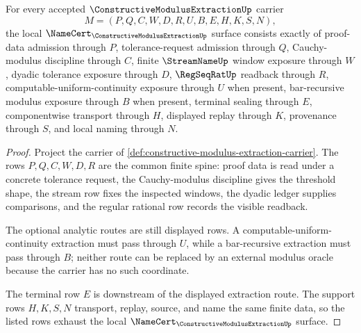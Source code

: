 \begin{theorem}
\label{thm:constructive-modulus-extraction-namecert-obligations}
For every accepted $\ConstructiveModulusExtractionUp$ carrier
$$
M=(P,Q,C,W,D,R,U,B,E,H,K,S,N),
$$
the local $\NameCert_{\ConstructiveModulusExtractionUp}$ surface consists exactly of proof-data admission through $P$, tolerance-request admission through $Q$, Cauchy-modulus discipline through $C$, finite $\StreamNameUp$ window exposure through $W$, dyadic tolerance exposure through $D$, $\RegSeqRatUp$ readback through $R$, computable-uniform-continuity exposure through $U$ when present, bar-recursive modulus exposure through $B$ when present, terminal sealing through $E$, componentwise transport through $H$, displayed replay through $K$, provenance through $S$, and local naming through $N$.
\end{theorem}
\begin{proof}
Project the carrier of \autoref{def:constructive-modulus-extraction-carrier}. The rows $P,Q,C,W,D,R$ are the common finite spine: proof data is read under a concrete tolerance request, the Cauchy-modulus discipline gives the threshold shape, the stream row fixes the inspected windows, the dyadic ledger supplies comparisons, and the regular rational row records the visible readback.

The optional analytic routes are still displayed rows. A computable-uniform-continuity extraction must pass through $U$, while a bar-recursive extraction must pass through $B$; neither route can be replaced by an external modulus oracle because the carrier has no such coordinate.

The terminal row $E$ is downstream of the displayed extraction route. The support rows $H,K,S,N$ transport, replay, source, and name the same finite data, so the listed rows exhaust the local $\NameCert_{\ConstructiveModulusExtractionUp}$ surface.
\end{proof}

